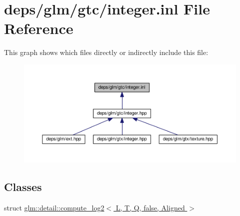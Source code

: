 \hypertarget{gtc_2integer_8inl}{}\section{deps/glm/gtc/integer.inl File Reference}
\label{gtc_2integer_8inl}
This graph shows which files directly or indirectly include this file\+:
\nopagebreak
\begin{figure}[H]
\begin{center}
\leavevmode
\includegraphics[width=350pt]{d9/d22/gtc_2integer_8inl__dep__incl}
\end{center}
\end{figure}
\subsection*{Classes}
\begin{DoxyCompactItemize}
\item 
struct \hyperlink{structglm_1_1detail_1_1compute__log2_3_01L_00_01T_00_01Q_00_01false_00_01Aligned_01_4}{glm\+::detail\+::compute\+\_\+log2$<$ L, T, Q, false, Aligned $>$}
\end{DoxyCompactItemize}
